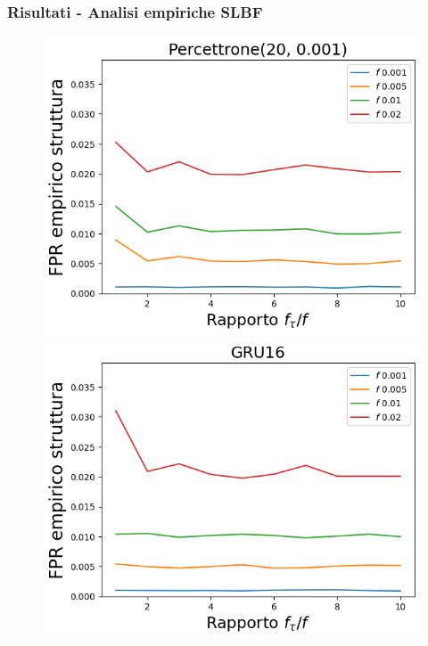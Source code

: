 \documentclass{beamer}
\begin{document}
\begin{frame}
    \frametitle{Risultati - Analisi empiriche SLBF}
    \begin{figure}[htbp]
        \centering
        \begin{minipage}{0.25\textwidth}
        \centering
        \includegraphics[width=\textwidth]{immagini/7/SLBF/Percettrone(20, 0.001)_FPR.png}
        \end{minipage}%
        \hfill
        \begin{minipage}{0.25\textwidth}
        \centering
        \includegraphics[width=\textwidth]{immagini/7/SLBF/GRU16_FPR.png}
        \end{minipage}%

\end{figure}
\end{frame}
\end{document}
